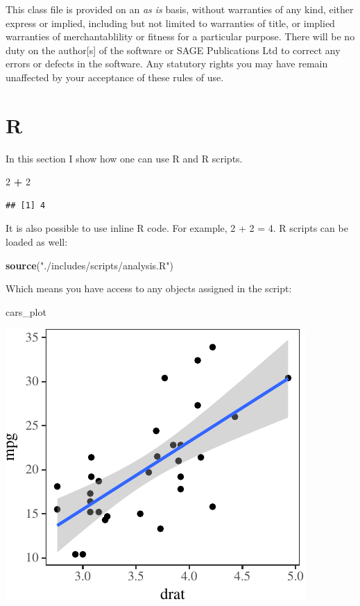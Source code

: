 \documentclass[Afour,sageh,times]{includes/tex/sagej}
\newenvironment{Shaded}{\begin{snugshade}}{\end{snugshade}}
\newcommand{\KeywordTok}[1]{\textcolor[rgb]{0.13,0.29,0.53}{\textbf{#1}}}
\newcommand{\DecValTok}[1]{\textcolor[rgb]{0.00,0.00,0.81}{#1}}
\newcommand{\StringTok}[1]{\textcolor[rgb]{0.31,0.60,0.02}{#1}}
\newcommand{\OperatorTok}[1]{\textcolor[rgb]{0.81,0.36,0.00}{\textbf{#1}}}
\newcommand{\NormalTok}[1]{#1}
\begin{document}
This class file is provided on an \textit{as is} basis, without
warranties of any kind, either express or implied, including but not
limited to warranties of title, or implied warranties of
merchantablility or fitness for a particular purpose. There will be no
duty on the author{[}s{]} of the software or SAGE Publications Ltd to
correct any errors or defects in the software. Any statutory rights you
may have remain unaffected by your acceptance of these rules of use.

\section{R}

In this section I show how one can use R and R scripts.

\begin{Shaded}
\begin{Highlighting}[]
\DecValTok{2} \OperatorTok{+}\StringTok{ }\DecValTok{2}
\end{Highlighting}
\end{Shaded}

\begin{verbatim}
## [1] 4
\end{verbatim}

\noindent It is also possible to use inline R code. For example, 2 + 2 =
4. R scripts can be loaded as well:

\begin{Shaded}
\begin{Highlighting}[]
\KeywordTok{source}\NormalTok{(}\StringTok{"./includes/scripts/analysis.R"}\NormalTok{)}
\end{Highlighting}
\end{Shaded}

\noindent Which means you have access to any objects assigned in the
script:

\begin{Shaded}
\begin{Highlighting}[]
\NormalTok{cars_plot}
\end{Highlighting}
\end{Shaded}

\begin{flushleft}\includegraphics{./includes/figs/ex_plot-1} \end{flushleft}
\end{document}
